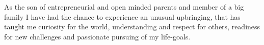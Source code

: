 \documentclass[margin]{res}
\begin{document}
\begin{resume}
As the son of entrepreneurial and open minded parents and member of a big family I have had the chance to experience an unusual upbringing, that has taught me curiosity for the world, understanding and respect for others, readiness for new challenges and passionate pursuing of my life-goals.

\end{resume} 
\end{document}
